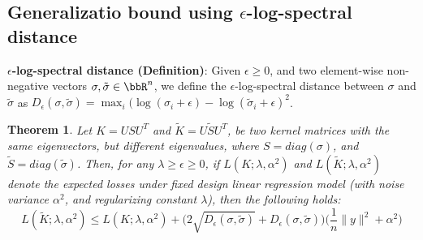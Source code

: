 \documentclass[12pt]{article}
\newcommand{\eps}{\epsilon}
\newcommand{\tS}{\tilde{S}}
\newcommand{\tK}{\tilde{K}}
\newcommand{\tsigma}{\tilde{\sigma}}
\newtheorem{theorem}{Theorem}[section]
\begin{document}
\subsection{Generalizatio bound using $\eps$-log-spectral distance}

\textbf{$\eps$-log-spectral distance (Definition)}:  Given $\eps \geq 0$, and two element-wise non-negative vectors $\sigma,\tsigma \in \RR^n$,  we define the $\eps$-log-spectral distance between $\sigma$ and $\tsigma$ as $D_{\eps}(\sigma,\tsigma) = \max_i (\log(\sigma_i + \eps) - \log(\tsigma_i + \eps)^2$.
\begin{theorem}
	Let $K = USU^T$ and $\tK = U\tS U^T$, be two kernel matrices with the same eigenvectors, but different eigenvalues, where $S = diag(\sigma)$, and $\tS = diag(\tsigma)$.  Then, for any $\lambda \geq \eps \geq 0$, if $L(K; \lambda, \alpha^2)$ and $L(\tK; \lambda, \alpha^2)$ denote the expected losses under fixed design linear regression model (with noise variance $\alpha^2$, and regularizing constant $\lambda$), then the following holds:
	$$L(\tK; \lambda, \alpha^2) \leq L(K; \lambda, \alpha^2) + \Big(2\sqrt{D_{\eps}(\sigma,\tsigma)} + D_{\eps}(\sigma,\tsigma)\Big)\Big(\frac{1}{n}\|y\|^2 + \alpha^2\Big)$$
\end{theorem}
\end{document}
